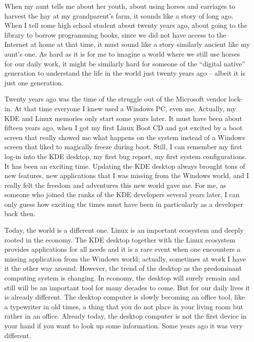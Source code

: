 
\noindent{}When my aunt tells me about her youth, about using horses and carriages to harvest the hay at my grandparent's farm, it sounds like a story of long ago. When I tell some high school student about twenty years ago, about going to the library to borrow programming books, since we did not have access to the Internet at home at that time, it must sound like a story similarly ancient like my aunt’s one. As hard as it is for me to imagine a world where we still use horses for our daily work, it might be similarly hard for someone of the ``digital native'' generation to understand the life in the world just twenty years ago – albeit it is just one generation.

Twenty years ago was the time of the struggle out of the Microsoft vendor lock-in. At that time everyone I knew used a Windows PC, even me. Actually, my KDE and Linux memories only start some years later. It must have been about fifteen years ago, when I got my first Linux Boot CD and got excited by a boot screen that really showed me what happens on the system instead of a Windows screen that liked to magically freeze during boot. Still, I can remember my first log-in into the KDE desktop, my first bug report, my first system configurations. It has been an exciting time. Updating the KDE desktop always brought tons of new features, new applications that I was missing from the Windows world, and I really felt the freedom and adventures this new world gave me. For me, as someone who joined the ranks of the KDE developers several years later, I can only guess how exciting the times must have been in particularly as a developer back then.

Today, the world is a different one. Linux is an important ecosystem and deeply rooted in the economy. The KDE desktop together with the Linux ecosystem provides applications for all needs and it is a rare event when one encounters a missing application from the Windows world; actually, sometimes at work I have it the other way around. However, the trend of the desktop as the predominant computing system is changing. In economy, the desktop will surely remain and still will be an important tool for many decades to come. But for our daily lives it is already different. The desktop computer is slowly becoming an office tool, like a typewriter in old times, a thing that you do not place in your living room but rather in an office. Already today, the desktop computer is not the first device in your hand if you want to look up some information. Some years ago it was very different.

